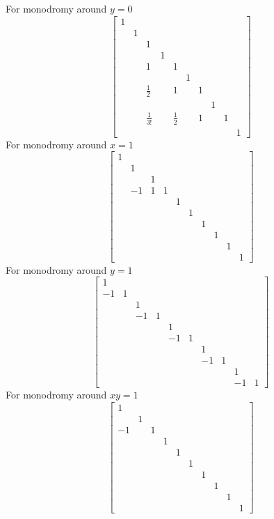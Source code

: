 \documentclass[main]{subfiles}
\begin{document}
For monodromy around $y=0$
\[\begin{bmatrix}
1&&&&&&&&&\\
&1&&&&&&&&\\
&&1&&&&&&&\\
&&&1&&&&&&\\
&&1&&1&&&&&\\
&&&&&1&&&&\\
&&\frac{1}{2}&&1&&1&&&\\
&&&&&&&1&&\\
&&\frac{1}{3!}&&\frac{1}{2}&&1&&1&\\
&&&&&&&&&1
\end{bmatrix}\]
For monodromy around $x=1$
\[\begin{bmatrix}
1&&&&&&&&&\\
&1&&&&&&&&\\
&&1&&&&&&&\\
&-1&1&1&&&&&&\\
&&&&1&&&&&\\
&&&&&1&&&&\\
&&&&&&1&&&\\
&&&&&&&1&&\\
&&&&&&&&1&\\
&&&&&&&&&1
\end{bmatrix}\]
For monodromy around $y=1$
\[\begin{bmatrix}
1&&&&&&&&&\\
-1&1&&&&&&&&\\
&&1&&&&&&&\\
&&-1&1&&&&&&\\
&&&&1&&&&&\\
&&&&-1&1&&&&\\
&&&&&&1&&&\\
&&&&&&-1&1&&\\
&&&&&&&&1&\\
&&&&&&&&-1&1
\end{bmatrix}\]
For monodromy around $xy=1$
\[\begin{bmatrix}
1&&&&&&&&&\\
&1&&&&&&&&\\
-1&&1&&&&&&&\\
&&&1&&&&&&\\
&&&&1&&&&&\\
&&&&&1&&&&\\
&&&&&&1&&&\\
&&&&&&&1&&\\
&&&&&&&&1&\\
&&&&&&&&&1
\end{bmatrix}\]
\end{document}
